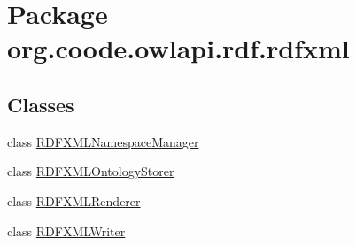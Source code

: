 \hypertarget{namespaceorg_1_1coode_1_1owlapi_1_1rdf_1_1rdfxml}{\section{Package org.\-coode.\-owlapi.\-rdf.\-rdfxml}
\label{namespaceorg_1_1coode_1_1owlapi_1_1rdf_1_1rdfxml}
}
\subsection*{Classes}
\begin{DoxyCompactItemize}
\item 
class \hyperlink{classorg_1_1coode_1_1owlapi_1_1rdf_1_1rdfxml_1_1_r_d_f_x_m_l_namespace_manager}{R\-D\-F\-X\-M\-L\-Namespace\-Manager}
\item 
class \hyperlink{classorg_1_1coode_1_1owlapi_1_1rdf_1_1rdfxml_1_1_r_d_f_x_m_l_ontology_storer}{R\-D\-F\-X\-M\-L\-Ontology\-Storer}
\item 
class \hyperlink{classorg_1_1coode_1_1owlapi_1_1rdf_1_1rdfxml_1_1_r_d_f_x_m_l_renderer}{R\-D\-F\-X\-M\-L\-Renderer}
\item 
class \hyperlink{classorg_1_1coode_1_1owlapi_1_1rdf_1_1rdfxml_1_1_r_d_f_x_m_l_writer}{R\-D\-F\-X\-M\-L\-Writer}
\end{DoxyCompactItemize}

